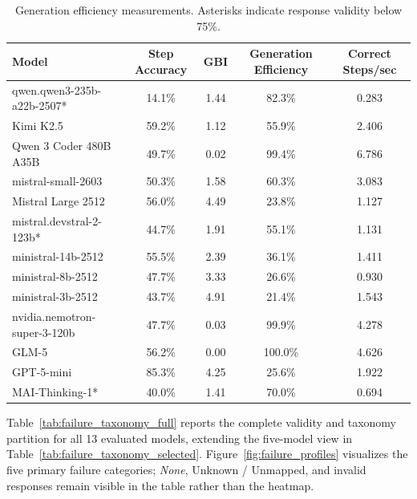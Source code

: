 \documentclass{article}
\begin{document}
\begin{table}[!ht]
\centering
\caption{Generation efficiency measurements. Asterisks indicate response validity below 75\%.}
\label{tab:generation_efficiency}
\scriptsize
\begin{tabular}{lcccc}
\toprule
\textbf{Model} & \textbf{Step Accuracy} & \textbf{GBI} & \textbf{Generation Efficiency} & \textbf{Correct Steps/sec} \\
\midrule
qwen.qwen3-235b-a22b-2507* & 14.1\% & 1.44 & 82.3\% & 0.283 \\
Kimi K2.5 & 59.2\% & 1.12 & 55.9\% & 2.406 \\
Qwen 3 Coder 480B A35B & 49.7\% & 0.02 & 99.4\% & 6.786 \\
mistral-small-2603 & 50.3\% & 1.58 & 60.3\% & 3.083 \\
Mistral Large 2512 & 56.0\% & 4.49 & 23.8\% & 1.127 \\
mistral.devstral-2-123b* & 44.7\% & 1.91 & 55.1\% & 1.131 \\
ministral-14b-2512 & 55.5\% & 2.39 & 36.1\% & 1.411 \\
ministral-8b-2512 & 47.7\% & 3.33 & 26.6\% & 0.930 \\
ministral-3b-2512 & 43.7\% & 4.91 & 21.4\% & 1.543 \\
nvidia.nemotron-super-3-120b & 47.7\% & 0.03 & 99.9\% & 4.278 \\
GLM-5 & 56.2\% & 0.00 & 100.0\% & 4.626 \\
GPT-5-mini & 85.3\% & 4.25 & 25.6\% & 1.922 \\
MAI-Thinking-1* & 40.0\% & 1.41 & 70.0\% & 0.694 \\
\bottomrule
\end{tabular}
\end{table}

Table~\ref{tab:failure_taxonomy_full} reports the complete validity and taxonomy partition for all 13 evaluated models, extending the five-model view in Table~\ref{tab:failure_taxonomy_selected}. Figure~\ref{fig:failure_profiles} visualizes the five primary failure categories; \emph{None}, Unknown / Unmapped, and invalid responses remain visible in the table rather than the heatmap.
\end{document}
